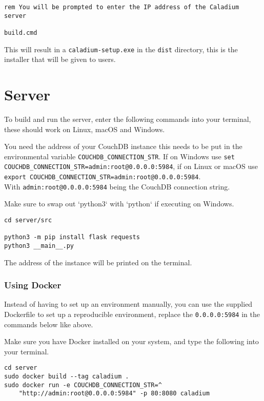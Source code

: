\begin{appendices}
\begin{lstlisting}
rem You will be prompted to enter the IP address of the Caladium server

build.cmd
\end{lstlisting}

This will result in a \texttt{caladium-setup.exe} in the \texttt{dist} directory,
this is the installer that will be given to users.
\section{Server}
To build and run the server, enter the following commands into your terminal,
these should work on Linux, macOS and Windows.

You need the address of your CouchDB instance this needs
to be put in the environmental variable \texttt{COUCHDB\_CONNECTION\_STR}.
If on Windows use
\texttt{set COUCHDB\_CONNECTION\_STR=admin:root@0.0.0.0:5984},
if on Linux or macOS use
\texttt{export COUCHDB\_CONNECTION\_STR=admin:root@0.0.0.0:5984}. \\
With \texttt{admin:root@0.0.0.0:5984} being the CouchDB connection string.

Make sure to swap out `python3` with `python` if executing on Windows.
\begin{lstlisting}
cd server/src

python3 -m pip install flask requests
python3 __main__.py
\end{lstlisting}
The address of the instance will be printed on the terminal.

\subsubsection{Using Docker}
Instead of having to set up an environment manually,
you can use the supplied Dockerfile
to set up a reproducible environment,
replace the \texttt{0.0.0.0:5984} in the commands below like above.

Make sure you have Docker installed on your system,
and type the following into your terminal.

\begin{lstlisting}
cd server
sudo docker build --tag caladium .
sudo docker run -e COUCHDB_CONNECTION_STR=^
    "http://admin:root@0.0.0.0:5984" -p 80:8080 caladium
\end{lstlisting}

\end{appendices}
